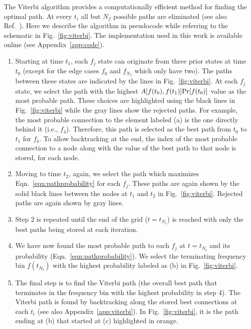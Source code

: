 \documentclass[paper-main.tex]{subfiles}
\begin{document}
The Viterbi algorithm provides a computationally efficient method for finding the optimal path. 
At every $t_i$ all but $N_f$ possible paths are eliminated (see also Ref.~\cite{ScoX1ViterbiO1:2017}). 
Here we describe the algorithm in pseudocode while referring to the schematic in Fig.~\ref{fig:viterbi}.%
The implementation used in this work is available online (see Appendix~\ref{app:code}).
\begin{enumerate}
\item Starting at time $t_1$, each $f_j$ state can originate from three prior states at time $t_0$ (except for the edge cases $f_0$ and $f_{N_f}$ which only have two). 
The paths between these states are indicated by the lines in Fig.~\ref{fig:viterbi}. 
At each $f_j$ state, we select the path with the highest $A[f(t_0),f(t_1)] {\rm Pr}[f(t_0)]$ value as the most probable path. 
These choices are highlighted using the black lines in Fig.~\ref{fig:viterbi} while the gray lines show the rejected paths. 
For example, the most probable connection to the element labeled (a) is the one directly behind it (i.e., $f_4$). 
Therefore, this path is selected as the best path from $t_0$ to $t_1$ for $f_4$.
To allow backtracking at the end, the index of the most probable connection to a node along with the value of the best path to that node is stored, for each node.

\item Moving to time $t_2$, again, we select the path which maximizes Eqn.~\ref{eqn:pathprobability} for each $f_j$. 
These paths are again shown by the solid black lines between the nodes at $t_1$ and $t_2$ in Fig.~\ref{fig:viterbi}.
Rejected paths are again shown by gray lines. 

\item Step 2 is repeated until the end of the grid ($t=t_{N_t}$) is reached with only the best paths being stored at each iteration. 

\item We have now found the most probable path to each $f_j$ at $t=t_{N_t}$ and its probability (Eqn.~\ref{eqn:pathprobability}). 
We select the terminating frequency bin $f(t_{N_t})$ with the highest probability labeled as (b) in Fig.~\ref{fig:viterbi}.

\item The final step is to find the Viterbi path (the overall best path that terminates in the frequency bin with the highest probability in step 4). 
The Viterbi path is found by backtracking along the stored best connections at each $t_i$ (see also Appendix~\ref{app:viterbi}). 
In Fig.~\ref{fig:viterbi}, it is the path ending at (b) that started at (c) highlighted in orange.
\end{enumerate}
\end{document}
